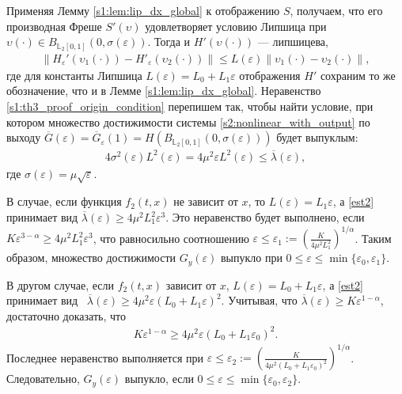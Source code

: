 \documentclass[../main.tex]{subfiles}
\begin{document}
 \doc
 Применяя Лемму \ref{s1:lem:lip_dx_global} к отображению $S$, получаем, что его производная Фреше $S'(\upsilon)$ удовлетворяет условию Липшица
 при $ \upsilon(\cdot) \in B_{\mathbb{L}_2[0,1]}(0,\sigma(\varepsilon)) $.
 Тогда и $ H'(\upsilon(\cdot)) $ --- липшицева, 
 \begin{gather*}
 \left\| H_{\varepsilon}'(\upsilon_1(\cdot)) - H'_{\varepsilon}(\upsilon_2(\cdot)) \right\| \leqslant L(\varepsilon) \left\| \upsilon_1(\cdot) - \upsilon_2(\cdot)\right\|,
 \end{gather*}
 где для константы Липшица $ L(\varepsilon) = L_0 + L_1 \varepsilon$ отображения $ H' $ сохраним то же обозначение, что и в Лемме \ref{s1:lem:lip_dx_global}.
 Неравенство \eqref{s1:th3_proof_origin_condition} перепишем так, чтобы найти условие, при котором множество достижимости системы \eqref{s2:nonlinear_with_output} по выходу $ \overline{G}(\varepsilon) = \overline{G}_{\varepsilon}(1) = H (B_{\mathbb{L}_2[0,1]}(0,\sigma(\varepsilon)))$ будет выпуклым:
 \begin{gather}\label{est2}
 4\sigma^2(\varepsilon)L^2(\varepsilon) = 4\mu^2\varepsilon L^2(\varepsilon) \leqslant \overline{\lambda}(\varepsilon),
 \end{gather}
 где $ \sigma(\varepsilon) = \mu\sqrt{\varepsilon} $.
 
 В случае, если функция $ f_2(t,x) $ не зависит от $ x $, то $ L(\varepsilon) = L_1 \varepsilon $, а \eqref{est2} принимает вид $ \overline{\lambda}(\varepsilon) \geqslant 4\mu^2L_1^2 \varepsilon^3 $. 
Это неравенство будет выполнено, если $ K\varepsilon^{3 - \alpha} \geqslant 4\mu^2L_1^2 \varepsilon^3 $, что равносильно соотношению $ \varepsilon \leqslant \varepsilon_1 := \left(\frac{K}{4\mu^2L_1^2}\right)^{1/\alpha} $. 
Таким образом, множество достижимости $ G_y(\varepsilon)$ выпукло при $ 0 \leqslant \varepsilon \leqslant \min\{\varepsilon_0,\varepsilon_1\} $. 
 
 В другом случае, если $ f_2(t,x) $ зависит от $ x $, $ L(\varepsilon) =L_0+L_1\varepsilon $, а \eqref{est2} принимает вид \mbox{ $\overline{\lambda}(\varepsilon) \geqslant 4\mu^2 \varepsilon (L_0 + L_1 \varepsilon)^2 $}. 
Учитывая, что $ \overline{\lambda}(\varepsilon) \geqslant K \varepsilon^{1-\alpha} $, достаточно доказать, что 
\begin{gather*}
	K \varepsilon^{1-\alpha} \geqslant 4\mu^2 \varepsilon (L_0 + L_1 \varepsilon_0)^2.
\end{gather*}  
Последнее неравенство выполняется при $ \varepsilon \leqslant \varepsilon_2 := \left(\frac{K}{4\mu^2(L_0 + L_1\varepsilon_0)^2} \right)^{1/\alpha} $. 
Следовательно, $ G_y(\varepsilon) $ выпукло, если $ 0 \leqslant \varepsilon \leqslant \min\{\varepsilon_0, \varepsilon_2\} $.
 
\end{document}
